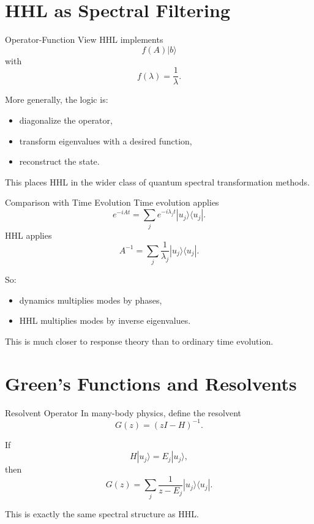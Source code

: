 \documentclass{beamer}
\begin{document}
\section{HHL as Spectral Filtering}

\begin{frame}{Operator-Function View}
HHL implements
\[
f(A)|b\rangle
\]
with
\[
f(\lambda)=\frac{1}{\lambda}.
\]

More generally, the logic is:
\begin{itemize}
\item diagonalize the operator,
\item transform eigenvalues with a desired function,
\item reconstruct the state.
\end{itemize}

This places HHL in the wider class of quantum spectral transformation methods.
\end{frame}


\begin{frame}{Comparison with Time Evolution}
Time evolution applies
\[
e^{-iAt} = \sum_j e^{-i\lambda_j t}|u_j\rangle\langle u_j|.
\]
HHL applies
\[
A^{-1} = \sum_j \frac{1}{\lambda_j}|u_j\rangle\langle u_j|.
\]

So:
\begin{itemize}
\item dynamics multiplies modes by phases,
\item HHL multiplies modes by inverse eigenvalues.
\end{itemize}

This is much closer to response theory than to ordinary time evolution.
\end{frame}

\section{Green's Functions and Resolvents}

\begin{frame}{Resolvent Operator}
In many-body physics, define the resolvent
\[
G(z) = (zI-H)^{-1}.
\]

If
\[
H|u_j\rangle = E_j |u_j\rangle,
\]
then
\[
G(z)=\sum_j \frac{1}{z-E_j}|u_j\rangle\langle u_j|.
\]

This is exactly the same spectral structure as HHL.
\end{frame}
\end{document}
